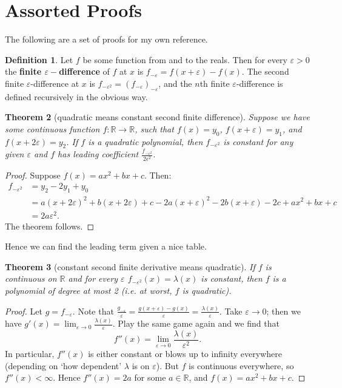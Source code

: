 \documentclass[a4paper]{amsart}
\newcommand{\df}[1]{\textbf{#1}}
\newtheorem{thm}{Theorem}[section]
\theoremstyle{definition}
\newtheorem{defn}[thm]{Definition}
\theoremstyle{remark}
\begin{document}
  \clearpage
  \section{Assorted Proofs}
  The following are a set of proofs for my own reference.
  \begin{defn}
    Let $ f $ be some function from and to the reals. Then for every $ \varepsilon > 0 $ the \df{finite $ \varepsilon-$difference} of $ f $
    at $ x $ is $ f_{-\varepsilon} = f(x + \varepsilon) - f(x) $. The second finite $\varepsilon$-difference at $ x $
    is $ f_{-\varepsilon^2} = \left(f_{-\varepsilon}\right)_{-\varepsilon} $, and the $ n$th finite $ \varepsilon$-difference is defined
    recursively in the obvious way.
  \end{defn}
  \begin{thm}[quadratic means constant second finite difference]
    Suppose we have some continuous function $ f : \mathbb{R} \to \mathbb{R} $, such that $ f(x) = y_0 $, $ f(x + \varepsilon) = y_1 $,
    and $ f(x + 2\varepsilon) = y_2 $. If $ f $ is a quadratic polynomial, then $ f_{-\varepsilon^2} $ is constant for any given $\varepsilon$
    and $ f $ has leading coefficient $ \frac{f_{-\varepsilon^2}}{2\epsilon^2} $.
  \end{thm}
  \begin{proof}
    Suppose $ f(x) = ax^2 + bx + c $. Then:
    \begin{align*}
      f_{-\varepsilon^2} &= y_2 - 2y_1 + y_0\\
                         &= a(x + 2\varepsilon)^2 + b(x + 2\varepsilon) + c - 2a(x + \varepsilon)^2 - 2b(x + \varepsilon) - 2c + ax^2 + bx + c\\
                         &= 2a\varepsilon^2.
    \end{align*}
    The theorem follows.
  \end{proof}
  Hence we can find the leading term given a nice table.

  \begin{thm}[constant second finite derivative means quadratic]
    If $ f $ is continuous on $ \mathbb{R} $ and for every $\varepsilon$ $ f_{-\varepsilon^2}(x) = \lambda(x) $ is constant, then $ f $ is a polynomial
    of degree at most 2 (i.e. at worst, $ f $ is quadratic).
  \end{thm}
  \begin{proof}
    Let $ g = f_{-\varepsilon} $. Note that $ \frac{g_{-\varepsilon}}{\varepsilon} = \frac{g(x + \varepsilon) - g(x)}{\varepsilon} = \frac{\lambda(x)}{\varepsilon} $.
    Take $ \varepsilon \to 0 $;  then we have $ g'(x) = \lim_{\varepsilon \to 0} \frac{\lambda(x)}{\varepsilon} $. Play the same game again and we find that
    \begin{displaymath}
      f''(x) = \lim_{\varepsilon \to 0} \frac{\lambda(x)}{\varepsilon^2}.
    \end{displaymath}
    In particular, $ f''(x) $ is either constant or blows up to infinity everywhere (depending on `how dependent' $\lambda$ is on $\varepsilon$). But $ f $ is
    continuous everywhere, so $ f''(x) < \infty $. Hence $ f''(x) = 2a $ for some $ a \in \mathbb{R} $, and $ f(x) = ax^2 + bx + c $.
  \end{proof}
\end{document}
